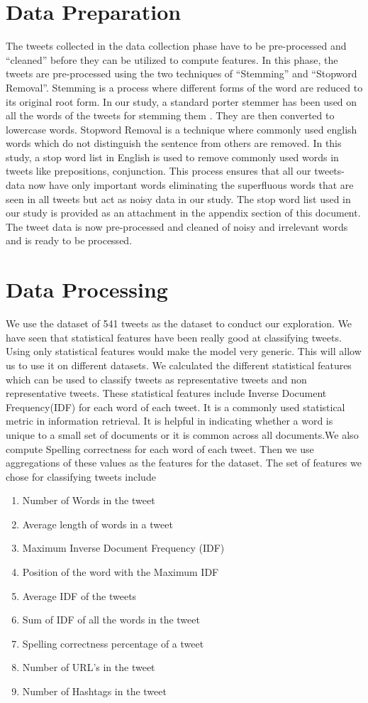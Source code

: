 \section{Data Preparation}
The tweets collected in the data collection phase have to be pre-processed and “cleaned” before they can be utilized to compute features.  In this phase, the tweets are pre-processed using the two techniques of “Stemming” and “Stopword Removal”. Stemming is a process where different forms of the word are reduced to its original root form. In our study, a standard porter stemmer has been used on all the words of the tweets for stemming them . They are then converted to lowercase words. Stopword Removal is a technique where commonly used english words which do not distinguish the sentence from others are removed. In this study, a stop word list in English is used to remove commonly used words in tweets like prepositions, conjunction. This process ensures that all our tweets-data now have only important words eliminating  the superfluous  words that are seen in all tweets but act as noisy data in our study. The stop word list used in our study is provided as an attachment in the appendix section of this document. The tweet data is now pre-processed and cleaned of noisy and irrelevant words and is ready to be processed. 

\section{Data Processing}
We use the dataset of 541 tweets as the dataset to conduct our exploration. We have seen that statistical features have been really good at classifying tweets. Using only statistical features would make the model very generic. This will allow us to use it on different datasets. We calculated the different statistical features which can be used to classify tweets as representative tweets and non representative tweets. These statistical features include Inverse Document Frequency(IDF) for each word of each tweet. It is a commonly used statistical metric in information retrieval. It is helpful in indicating whether a word is unique to a small set of documents or it is common across all documents.We also compute Spelling correctness for each word of each tweet. Then we use aggregations of these values as the features for the dataset. The set of features we chose for classifying tweets include

\begin{enumerate}
\item Number of Words in the tweet
\item Average length of words in a tweet
\item Maximum Inverse Document Frequency (IDF)
\item Position of the word with the Maximum IDF
\item Average IDF of the tweets
\item Sum of IDF of all the words in the tweet
\item Spelling correctness percentage of  a tweet
\item Number of URL’s in the tweet
\item Number of Hashtags in the tweet
\end{enumerate}

